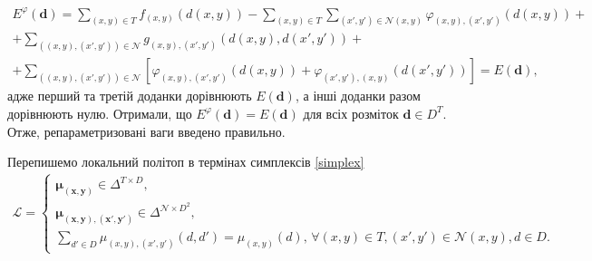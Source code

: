 \begin{equation*}
\begin{gathered}
    E^{\varphi} \left( \pmb{d} \right)
    = \sum \limits_{\left(x, y \right) \in T}
        f_{\left(x, y \right)} \left(d \left(x, y \right) \right)
    - \sum \limits_{\left(x, y \right) \in T}
        \sum \limits_{\left(x', y' \right) \in \mathcal{N} \left(x, y \right)}
            \varphi_{\left(x, y \right), \left(x', y' \right)} \left(
                d \left(x, y \right)
            \right) + \\
    + \sum \limits_{\left( \left(x, y \right), \left( x', y' \right) \right) \in \mathcal{N}}
        g_{\left(x, y \right), \left(x', y' \right)} \left(
            d \left(x, y \right), d \left(x', y' \right)
        \right) + \\
    + \sum \limits_{\left( \left(x, y \right), \left( x', y' \right) \right) \in \mathcal{N}}
        \left[
            \varphi_{\left(x, y \right), \left(x', y' \right)} \left(
                d \left(x, y \right)
            \right)
            + \varphi_{\left(x', y' \right), \left(x, y \right)} \left(
                d \left(x', y' \right)
            \right)
        \right] = E \left(\pmb{d} \right),
\end{gathered}
\end{equation*}
адже перший та третій доданки дорівнюють $E \left( \pmb{d} \right)$,
а інші доданки разом дорівнюють нулю.
Отримали, що
$E^{\varphi} \left(\pmb{d} \right)
    = E \left(\pmb{d} \right)$
для всіх розміток $\pmb{d} \in D^T$.
Отже, репараметризовані ваги введено правильно.

Перепишемо локальний політоп в термінах симплексів \eqref{simplex}
\begin{equation*}
\begin{gathered}
    \mathcal{L} =
    \begin{cases}
        \pmb{\mu_{\left(x, y \right)}} \in \Delta^{T \times D}, \\
        \pmb{\mu_{ \left(x, y \right), \left(x', y' \right)}} \in
            \Delta^{\mathcal{N} \times D^2}, \\
        \sum \limits_{d' \in D}
            \mu_{\left(x, y \right), \left(x', y' \right)} \left(d, d' \right) =
            \mu_{\left(x, y \right)} \left(d \right), \,
        \forall \left(x, y \right) \in T,
        \left(x', y' \right) \in \mathcal{N} \left(x, y \right),
        d \in D.
    \end{cases}
\end{gathered}
\end{equation*}

